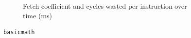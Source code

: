 \documentclass[../bachelor_paper.tex]{subfiles}
\begin{document}
\begin{figure}
\begin{subfigure}{0.45\textwidth}
        \caption{Fetch coefficient and cycles wasted per instruction over time (ms)}
    \end{subfigure}
    \caption{\texttt{basicmath}}
\end{figure}

\isstandalone



\fi
\end{document}

